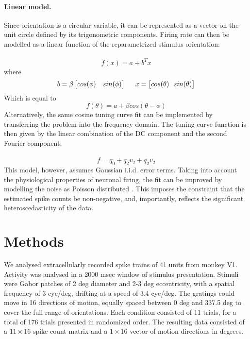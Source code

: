 \documentclass[10pt]{article}
\begin{document}
\paragraph{Linear model.} Since orientation is a circular variable, it can be represented as a vector on the unit circle defined by its trigonometric components. Firing rate can then be modelled as a linear function of the reparametrized stimulus orientation: \\ \\
\begin{equation*}
f(x) = a+b^Tx
\end{equation*}
where 
\begin{align*}
b = \beta \begin{bmatrix}
cos (\phi) & sin (\phi )
 \end{bmatrix}  
 \hspace{5mm}
 x =  \begin{bmatrix}
cos (\theta) \ \
  sin (\theta)
 \end{bmatrix} 
\end{align*}
Which is equal to 
\begin{equation*}
f(\theta) = a+ \beta cos(\theta - \phi)
\end{equation*}
Alternatively, the same cosine tuning curve fit can be implemented by transferring the problem into the frequency domain. The tuning curve function is then given by the linear combination of the DC component and the second Fourier component: \\ \\
\begin{equation*}
f = q_0+q_2v_2+ \bar{q_2}\bar{v_2}
\end{equation*}
This model, however, assumes Gaussian i.i.d. error terms. Taking into account the physiological properties of neuronal firing, the fit can be improved by modelling the noise as Poisson distributed \cite{softky1993highly}. This imposes the constraint that the estimated spike counts be non-negative, and, importantly, reflects the significant heteroscedasticity of the data.


\section*{Methods}

We analysed extracellularly recorded spike trains of 41 units from monkey V1. Activity was analysed in a 2000 msec window of stimulus presentation. Stimuli were Gabor patches of 2 deg diameter and 2-3 deg eccentricity, with a spatial frequency of 3 cyc/deg, drifting at a speed of 3.4 cyc/deg. The gratings could move in 16 directions of motion, equally spaced between 0 deg and 337.5 deg to cover the full range of orientations. Each condition consisted of 11 trials, for a total of 176 trials presented in randomized order. The resulting data consisted of a $11\times16$ spike count matrix and a $1\times16$ vector of motion directions in degrees.\\
\end{document}
